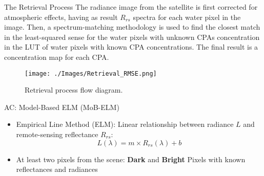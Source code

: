 \documentclass{beamer}
\begin{document}
\begin{frame}{}
\begin{columns}[t]
 \begin{column}{.31\linewidth}  %
\begin{block}{The Retrieval Process}
\justifying\small The radiance image from the satellite is first corrected for atmospheric effects, having as result $R_{rs}$ spectra for each water pixel in the image. Then, a spectrum-matching methodology is used to find the closest match in the least-squared sense for the water pixels with unknown CPAs concentration in the LUT of water pixels with known CPA concentrations. The final result is a concentration map for each CPA.
\vspace{1cm}   
\begin{center}
\begin{figure}[htbp!]
  \centering
    \texttt{[image: ./Images/Retrieval\_RMSE.png]}
    \caption{Retrieval process flow diagram.   \label{fig:retrieval} }
\end{figure}
\end{center}
\end{block}




\begin{block}{AC: Model-Based ELM (MoB-ELM)}

\begin{itemize}
  \item \small Empirical Line Method (ELM): Linear relationship between radiance $L$ and remote-sensing reflectance $R_{rs}$:
\begin{equation}
  L(\lambda)=m\times R_{rs}(\lambda)+b
\end{equation}

\vspace{0.2cm}
\item \small At least two pixels from the scene: {\bf \small Dark} and {\bf \small Bright} Pixels with known reflectances and radiances

\end{itemize}

\begin{figure}[htb]
  \centering
{}
\end{figure}
\end{block}
\end{column}
\end{columns}
\end{frame}
\end{document}
